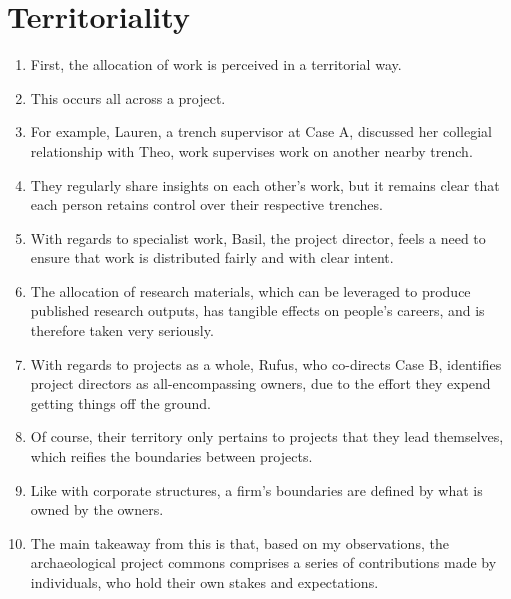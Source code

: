 \documentclass{article}
\begin{document}
\section{Territoriality}
\begin{enumerate}
  \item First, the allocation of work is perceived in a territorial way.
  \item This occurs all across a project.
  \item For example, Lauren, a trench supervisor at Case A, discussed her collegial relationship with Theo, work supervises work on another nearby trench.
  \item They regularly share insights on each other's work, but it remains clear that each person retains control over their respective trenches.
  \item With regards to specialist work, Basil, the project director, feels a need to ensure that work is distributed fairly and with clear intent.
  \item The allocation of research materials, which can be leveraged to produce published research outputs, has tangible effects on people's careers, and is therefore taken very seriously.
  \item With regards to projects as a whole, Rufus, who co-directs Case B, identifies project directors as all-encompassing owners, due to the effort they expend getting things off the ground.
  \item Of course, their territory only pertains to projects that they lead themselves, which reifies the boundaries between projects.
  \item Like with corporate structures, a firm's boundaries are defined by what is owned by the owners.
  \item The main takeaway from this is that, based on my observations, the archaeological project commons comprises a series of contributions made by individuals, who hold their own stakes and expectations.

\end{enumerate}
\end{document}
